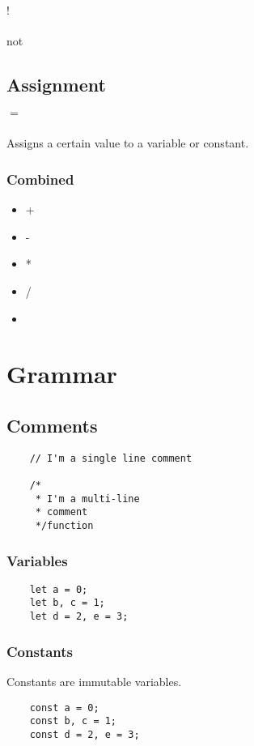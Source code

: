 \documentclass{report}
\begin{document}
\paragraph{$!$} not
\section{Assignment}
\paragraph{$=$} Assigns a certain value to a variable or constant.

\subsection{Combined}






\begin{itemize}
    \item{+}
    \item{-}
    \item{*}
    \item{/}
    \item{}
\end{itemize}


\chapter{Grammar}
\section{Comments}
\begin{verbatim}
    // I'm a single line comment

    /*
     * I'm a multi-line 
     * comment
     */function
\end{verbatim}
\subsection{Variables}
\begin{verbatim}
    let a = 0;
    let b, c = 1;
    let d = 2, e = 3;
\end{verbatim}
\subsection{Constants}
Constants are immutable variables.
\begin{verbatim}
    const a = 0;
    const b, c = 1;
    const d = 2, e = 3;
\end{verbatim}
\end{document}
